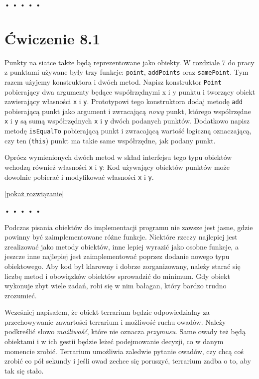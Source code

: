 \begin{center}
• • • • •
\end{center}

  
\section*{Ćwiczenie 8.1}
\label{sec:8.1}
  
    
Punkty na siatce także będą reprezentowane jako obiekty. W \hyperref[chap:7]{rozdziale 7} do pracy z punktami używane były trzy funkcje: \texttt{point}, \texttt{addPoints} oraz \texttt{samePoint}. Tym razem użyjemy konstruktora i dwóch metod. Napisz konstruktor \texttt{Point} pobierający dwa argumenty będące współrzędnymi x i y punktu i tworzący obiekt zawierający własności \texttt{x} i \texttt{y}. Prototypowi tego konstruktora dodaj metodę \texttt{add} pobierającą punkt jako argument i zwracającą \emph{nowy} punkt, którego współrzędne \texttt{x} i \texttt{y} są sumą współrzędnych \texttt{x} i \texttt{y} dwóch podanych punktów. Dodatkowo napisz metodę \texttt{isEqualTo} pobierającą punkt i zwracającą wartość logiczną oznaczającą, czy ten (\texttt{this}) punkt ma takie same współrzędne, jak podany punkt.

    
Oprócz wymienionych dwóch metod w skład interfejsu tego typu obiektów wchodzą również własności \texttt{x} i \texttt{y}: Kod używający obiektów punktów może dowolnie pobierać i modyfikować własności \texttt{x} i \texttt{y}.

  
[\hyperref[sol:8.1]{pokaż rozwiązanie}]
  


\begin{center}
• • • • •
\end{center}

  
Podczas pisania obiektów do implementacji programu nie zawsze jest jasne, gdzie powinny być zaimplementowane różne funkcje. Niektóre rzeczy najlepiej jest zrealizować jako metody obiektów, inne lepiej wyrazić jako osobne funkcje, a jeszcze inne najlepiej jest zaimplementować poprzez dodanie nowego typu obiektowego. Aby kod był klarowny i dobrze zorganizowany, należy starać się liczbę metod i obowiązków obiektów sprowadzić do minimum. Gdy obiekt wykonuje zbyt wiele zadań, robi się w nim bałagan, który bardzo trudno zrozumieć.

  
Wcześniej napisałem, że obiekt terrarium będzie odpowiedzialny za przechowywanie zawartości terrarium i możliwość ruchu owadów. Należy podkreślić słowo \emph{możliwość}, które nie oznacza \emph{przymusu}. Same owady też będą obiektami i w ich gestii będzie leżeć podejmowanie decyzji, co w danym momencie zrobić. Terrarium umożliwia zaledwie pytanie owadów, czy chcą coś zrobić co pół sekundy i jeśli owad zechce się poruszyć, terrarium zadba o to, aby tak się stało.


